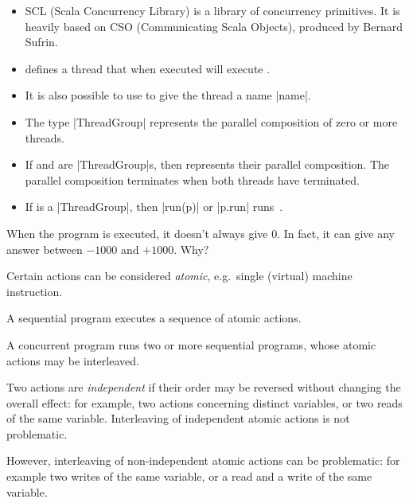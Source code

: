 \documentclass[notes,color]{sepslide0}
\begin{document}
\begin{slide}

\begin{itemize}
\item
SCL (Scala Concurrency Library) is a library of concurrency primitives.  It is
heavily based on CSO (Communicating Scala Objects), produced by Bernard
Sufrin.

\item {} defines a thread that when executed will
  execute .

\item It is also possible to use  to give the
  thread a name |name|.

\item The type |ThreadGroup| represents the parallel composition of zero or
  more threads.

\item If  and  are |ThreadGroup|s, then 
  represents their parallel composition.  The parallel composition terminates
  when both threads have terminated.

\item If  is a |ThreadGroup|, then |run(p)| or |p.run|
  runs~.
\end{itemize}
\end{slide}


\begin{slide}

When the program  is executed, it doesn't always give $0$.  In
fact, it can give any answer between $-1000$ and $+1000$.  Why?
\end{slide}


\begin{slide}

Certain actions can be considered \emph{atomic}, e.g.~single (virtual) machine
instruction.

A sequential program executes a sequence of atomic actions.

A concurrent program runs two or more sequential programs, whose atomic
actions may be interleaved.  

Two actions are \emph{independent} if their order may be reversed without
changing the overall effect: for example, two actions concerning distinct
variables, or two reads of the same variable.  Interleaving of independent
atomic actions is not problematic.

However, interleaving of non-independent atomic actions can be problematic:
for example two writes of the same variable, or a read and a write of the same
variable. 
\end{slide}
\end{document}
